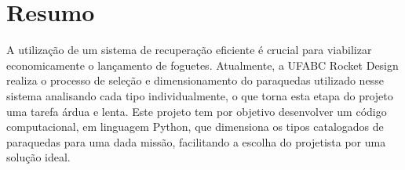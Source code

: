 \documentclass[a4paper, 12pt]{article}[abntex2]
\begin{document}
    \newpage
    \tableofcontents

    \newpage
    \onehalfspacing
        {
        \section{Resumo}
            A utilização de um sistema de recuperação eficiente é crucial para viabilizar economicamente o lançamento de foguetes. Atualmente, a UFABC Rocket Design realiza o processo de seleção e dimensionamento do paraquedas utilizado nesse sistema analisando cada tipo individualmente, o que torna esta etapa do projeto uma tarefa árdua e lenta. Este projeto tem por objetivo desenvolver um código computacional, em linguagem Python, que dimensiona os tipos catalogados de paraquedas para uma dada missão, facilitando a escolha do projetista por uma solução ideal.
}
\end{document}
